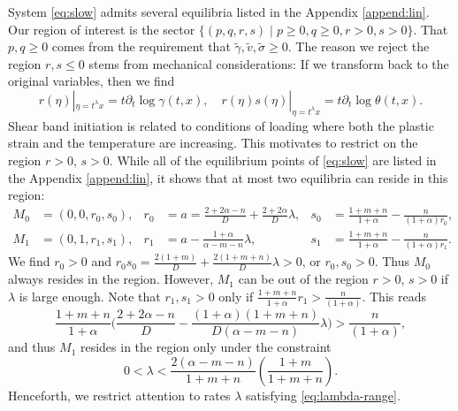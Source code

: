 \documentclass[a4paper,11pt]{article}
\def\tg{{\tilde{\gamma}}}
\def\tv{{\tilde{v}}}
\def\ts{{\tilde{\sigma}}}
\theoremstyle{remark}
\begin{document}
System \eqref{eq:slow} admits several equilibria listed in the Appendix \ref{append:lin}. Our region of interest is the sector $\{(p,q,r,s) \; | \; p\ge0, q\ge0, r>0, s>0 \}$. That $p,q\ge0$ comes from the requirement that $\tg,\tv,\ts\ge0$. The reason we reject the region $r,s\le0$ stems from mechanical considerations: If we transform back to the original variables, then we find
\begin{equation*}
 r(\eta)|_{\eta=t^\lambda x}=t\partial_t\log \gamma(t,x), \quad r(\eta)s(\eta)|_{\eta=t^\lambda x}=t\partial_t \log \theta(t,x).
\end{equation*}
Shear band initiation is related to conditions of loading where both the plastic strain and the temperature are increasing. This motivates to restrict on the region $r > 0$, $s > 0$. While all of the equilibrium points of \eqref{eq:slow} are listed in the Appendix \ref{append:lin}, it shows that at most two equilibria can reside in this region:
\begin{align*}
 M_0 &= (0,0,r_0,s_0), & r_0 &=a=\frac{2+2\alpha-n}{D} + \frac{2+2\alpha}{D}\lambda, & s_0&=\frac{1+m+n}{1+\alpha} - \frac{n}{(1+\alpha)r_0},\\
 M_1 &= (0,1,r_1,s_1), & r_1 &= a-\frac{1+\alpha}{\alpha-m-n}\lambda, & s_1&=\frac{1+m+n}{1+\alpha} - \frac{n}{(1+\alpha)r_1}.
\end{align*}
We find $r_0>0$ and $r_0s_0 = \frac{2(1+m)}{D} + \frac{2(1+m+n)}{D}\lambda>0$, or $r_0, s_0>0$. Thus $M_0$ always resides in the region. However, $M_1$ can be out of the region $r>0$, $s>0$ if $\lambda$ is large enough. Note that $r_1,s_1>0$ only if $\frac{1+m+n}{1+\alpha}r_1 > \frac{n}{(1+\alpha)}$. This reads
$$\frac{1+m+n}{1+\alpha}\Big(\frac{2+2\alpha-n}{D} - \frac{(1+\alpha)(1+m+n)}{D(\alpha-m-n)}\lambda\Big) > \frac{n}{(1+\alpha)},$$
and thus $M_1$ resides in the region only under the constraint
\begin{equation} \label{eq:lambda-range}
 0< \lambda < \frac{2(\alpha-m-n)}{1+m+n}\left(\frac{1+m}{1+m+n}\right).
\end{equation}
Henceforth, we restrict attention to rates $\lambda$ satisfying \eqref{eq:lambda-range}.
\end{document}
